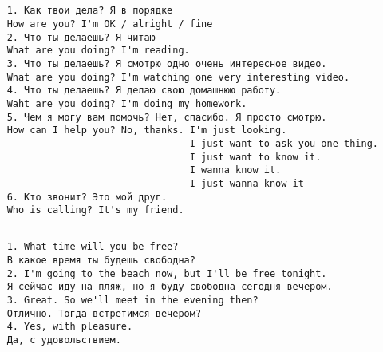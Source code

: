 \subsection*{}
\begin{verbatim}
    1. Как твои дела? Я в порядке
    How are you? I'm OK / alright / fine
    2. Что ты делаешь? Я читаю
    What are you doing? I'm reading.
    3. Что ты делаешь? Я смотрю одно очень интересное видео.
    What are you doing? I'm watching one very interesting video.
    4. Что ты делаешь? Я делаю свою домашнюю работу.
    Waht are you doing? I'm doing my homework.
    5. Чем я могу вам помочь? Нет, спасибо. Я просто смотрю.
    How can I help you? No, thanks. I'm just looking.
                                    I just want to ask you one thing.
                                    I just want to know it.
                                    I wanna know it.
                                    I just wanna know it
    6. Кто звонит? Это мой друг.
    Who is calling? It's my friend.
\end{verbatim}

\subsection*{}
\begin{verbatim}
    1. What time will you be free?
    В какое время ты будешь свободна?
    2. I'm going to the beach now, but I'll be free tonight.
    Я сейчас иду на пляж, но я буду свободна сегодня вечером.
    3. Great. So we'll meet in the evening then?
    Отлично. Тогда встретимся вечером?
    4. Yes, with pleasure.
    Да, с удовольствием.
\end{verbatim}